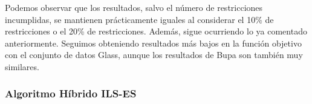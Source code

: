 Podemos observar que los resultados, salvo el número de restricciones incumplidas, se mantienen prácticamente iguales al considerar el 10\% de restricciones o el 20\% de restricciones.
Además, sigue ocurriendo lo ya comentado anteriormente. Seguimos obteniendo resultados más bajos en la función objetivo con el conjunto de datos Glass, aunque los resultados de Bupa son también muy similares.

\subsubsection{Algoritmo Híbrido ILS-ES}


\begin{table}[H]
	\tiny

	\begin{adjustwidth}{-1cm}{-1cm}%
	

\end{adjustwidth}
\end{table}
